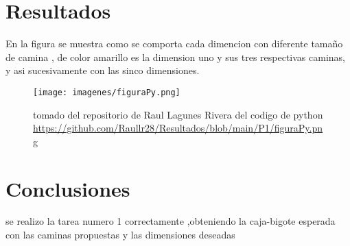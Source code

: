 \documentclass{article}
\begin{document}
\newpage

\section{Resultados}
En la figura se muestra como se comporta cada dimencion con diferente tamaño de camina , de color amarillo es la dimension uno y sus tres respectivas caminas, y asi sucesivamente con las sinco dimensiones.


 \begin{figure}[h]
     \centering
     \texttt{[image: imagenes/figuraPy.png]}
        \caption{tomado del repositorio de Raul Lagunes Rivera del codigo de python 
    \url{https://github.com/Raullr28/Resultados/blob/main/P1/figuraPy.png}}
     \label{}
 \end{figure}




 
 \section{Conclusiones}

 se realizo la tarea numero 1 correctamente ,obteniendo la caja-bigote esperada con las caminas propuestas y las dimensiones deseadas 
 
 
 

 
\end{document}
